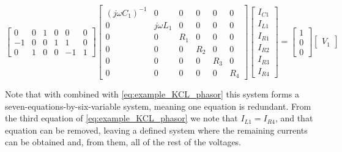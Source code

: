 \begin{example}
\begin{equation} %
%
	\left[\begin{array}{ccccccc}
	 0 &  0 &  1 & 0 & 0 & 0 \\[3mm]
	-1 &  0 &  0 & 1 & 1 & 0 \\[3mm]
	 0 &  1 &  0 & 0 &-1 & 1 
	\end{array}\right]
%
	\left[\begin{array}{ccccccc}
	\left(j\omega C_1\right)^{-1} &  0           &  0   & 0   & 0   & 0   \\[3mm]
	                            0 &  j\omega L_1 &  0   & 0   & 0   & 0   \\[3mm]
	                            0 &  0           &  R_1 & 0   & 0   & 0   \\[3mm]
	                            0 &  0           &  0   & R_2 & 0   & 0   \\[3mm]
	                            0 &  0           &  0   & 0   & R_3 & 0   \\[3mm]
	                            0 &  0           &  0   & 0   & 0   & R_4
	\end{array}\right]
%
	\left[\begin{array}{c}
		I_{C1} \\[3mm] I_{L1} \\[3mm] I_{R1} \\[3mm] I_{R2} \\[3mm] I_{R3} \\[3mm] I_{R4}
	\end{array}\right]
	=
%
	\left[\begin{array}{c}
		1 \\[3mm] 0 \\[3mm] 0
	\end{array}\right]
%
	\left[\begin{array}{c}
		V_1
	\end{array}\right]\label{eq:example_KVL_phasor}
\end{equation} %

	Note that with combined with \eqref{eq:example_KCL_phasor} this system forms a seven-equations-by-six-variable system, meaning one equation is redundant. From the third equation of \eqref{eq:example_KCL_phasor} we note that $I_{L1} = I_{R4}$, and that equation can be removed, leaving a defined system where the remaining currents can be obtained and, from them, all of the rest of the voltages.

\examplebar
\end{example}%

